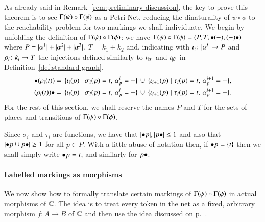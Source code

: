 As already said in Remark~\ref{rem:preliminary-discussion}, the key to prove this theorem is to see $\graph\psi \circ \graph\phi$ as a Petri Net, reducing the dinaturality of $\psi\circ\phi$ to the reachability problem for two markings we shall individuate. We begin by unfolding the definition of $\graph\psi \circ \graph\phi$: we have $\graph\psi \circ \graph\phi = (P,T,\inp{(-)},\out{(-)})$ where $P = \lvert \alpha^1 \rvert + \lvert \alpha^2 \rvert + \lvert \alpha^{3} \rvert$, $T = k_1 + k_2$ and, indicating with $\iota_{i} \colon \lvert \alpha^i \rvert \to P$ and $\rho_{i} \colon k_i \to T$ the injections defined similarly to $\iota_{\lvert \alpha \rvert}$ and $\iota_{\lvert \beta \rvert}$ in Definition~\ref{def:standard graph}, 
\begin{equation}\label{input-output-transitions}
\begin{aligned}
\inp{(\injT i (t))} &= \, 
\{ \injP i (p) \mid \sigma_i(p) = t,\, \alpha^i_p = +  \} \, \cup \, \{ \injP {i+1} (p) \mid \tau_i(p) = t,\, \alpha^{i+1}_p = -  \}, \\
\out{(\injT i (t))} &= \, 
\{ \injP i (p) \mid \sigma_i(p) = t,\, \alpha^i_p = -  \} \, \cup
\, \{ \injP {i+1} (p) \mid \tau_i(p) = t,\, \alpha^{i+1}_p = +  \}.
\end{aligned}
\end{equation}
For the rest of this section, we shall reserve the names $P$ and $T$ for the sets of places and transitions of $\graph\psi \circ \graph\phi$.

\begin{remark}\label{rem:graph of a transformation is FBCF}
	Since $\sigma_i$ and $\tau_i$ are functions, we have that $\length{\inp p}, \length{\out p} \le 1$ and also that $\length{\inp p \cup \out p }\ge 1$ for all $p\in P$. With a little abuse of notation then, if $\inp p = \{t\}$ then we shall simply write $\inp p = t$, and similarly for $\out p$.
\end{remark}

\paragraph{Labelled markings as morphisms} We now show how to formally translate certain markings of $\graph\psi \circ \graph\phi$ in actual morphisms of $\mathbb C$. The idea is to treat every token in the net as a fixed, arbitrary morphism $f \colon A \to B$ of $\mathbb C$ and then use the idea discussed on p.~\pageref{discussion:informal-reading-morphisms-in-a-box}.

